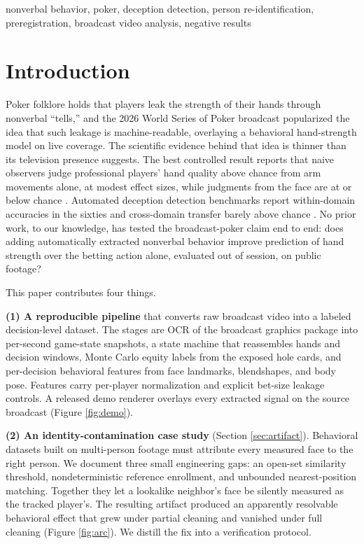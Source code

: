 \documentclass[conference]{IEEEtran}
\begin{document}
\begin{IEEEkeywords}
nonverbal behavior, poker, deception detection, person re-identification,
preregistration, broadcast video analysis, negative results
\end{IEEEkeywords}

\section{Introduction}

Poker folklore holds that players leak the strength of their hands through
nonverbal ``tells,'' and the 2026 World Series of Poker broadcast
popularized the idea that such leakage is machine-readable, overlaying a
behavioral hand-strength model on live coverage. The scientific evidence
behind that idea is thinner than its television presence suggests. The best
controlled result reports that naive observers judge professional players'
hand quality above chance from arm movements alone, at modest effect sizes,
while judgments from the face are at or below chance
\cite{slepian2013quality}. Automated deception detection benchmarks report
within-domain accuracies in the sixties and cross-domain transfer barely
above chance \cite{guo2023dolos}. No prior work, to our knowledge, has
tested the broadcast-poker claim end to end: does adding automatically
extracted nonverbal behavior improve prediction of hand strength over the
betting action alone, evaluated out of session, on public footage?

This paper contributes four things.

\textbf{(1) A reproducible pipeline} that converts raw broadcast video into
a labeled decision-level dataset. The stages are OCR of the broadcast
graphics package into per-second game-state snapshots, a state machine
that reassembles hands and decision windows, Monte Carlo equity labels
from the exposed hole cards, and per-decision behavioral features from
face landmarks, blendshapes, and body pose. Features carry per-player
normalization and explicit bet-size leakage controls. A released demo
renderer overlays every extracted signal on the source broadcast
(Figure \ref{fig:demo}).

\textbf{(2) An identity-contamination case study} (Section
\ref{sec:artifact}). Behavioral datasets built on multi-person footage must
attribute every measured face to the right person. We document three small
engineering gaps: an open-set similarity threshold, nondeterministic
reference enrollment, and unbounded nearest-position matching. Together
they let a lookalike neighbor's face be silently measured as the tracked
player's. The resulting artifact produced an apparently resolvable
behavioral effect that grew under partial cleaning and vanished under full
cleaning (Figure \ref{fig:arc}). We distill the fix into a verification
protocol.
\end{document}
